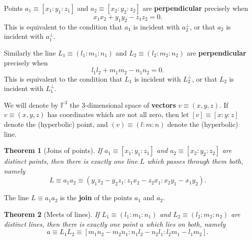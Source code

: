 \documentclass{unswthesis}
\newtheorem{theorem}{Theorem}
\begin{document}
Points $a_{1}\equiv[x_{1}:y_{1}:z_{1}]$ and $a_{2}\equiv[x_{2}:y_{2}:z_{2}]$
are \textbf{perpendicular} precisely when 
\begin{equation*}
x_{1}x_{2}+y_{1}y_{2}-z_{1}z_{2}=0. 
\end{equation*}
This is equivalent to the condition that $a_{1}$ is incident with $%
a_{2}^{\perp}$, or that $a_{2}$ is incident with $a_{1}^{\perp}$.\newline

Similarly the line $L_{1}\equiv(l_{1}:m_{1}:n_{1})$ and $L_{2}%
\equiv(l_{2}:m_{2}:n_{2})$ are \textbf{perpendicular} precisely when 
\begin{equation*}
l_{1}l_{2}+m_{1}m_{2}-n_{1}n_{2}=0. 
\end{equation*}
This is equivalent to the condition that $L_{1}$ is incident with $%
L_{2}^{\perp}$, or that $L_{2}$ is incident with $L_{1}^{\perp}$.\newline

We will denote by $\mathbb{F}^{3}$ the 3-dimensional space of \textbf{vectors%
} $v\equiv(x,y,z)$. If $v\equiv(x,y,z)$ has coordinates which are not all
zero, then let $[v]\equiv[x:y:z]$ denote the (hyperbolic) point, and $%
(v)\equiv(l:m:n)$ denote the (hyperbolic) line.\newline

\begin{theorem}[Joins of points]
If $a_{1}\equiv[x_{1}:y_{1}:z_{1}]$ and $a_{2}\equiv[x_{2}:y_{2}:z_{2}]$ are
distinct points, then there is exactly one line $L$ which passes through
them both, namely 
\begin{equation*}
L\equiv
a_{1}a_{2}%
\equiv(y_{1}z_{2}-y_{2}z_{1}:z_{1}x_{2}-z_{2}x_{1}:x_{2}y_{1}-x_{1}y_{2}). 
\end{equation*}
\end{theorem}

The line $L\equiv a_{1}a_{2}$ is the \textbf{join} of the points $a_{1}$ and 
$a_{2}$.\newline

\begin{theorem}[Meets of lines]
If $L_{1}\equiv(l_{1}:m_{1}:n_{1})$ and $L_{2}\equiv(l_{2}:m_{2}:n_{2})$ are
distinct lines, then there is exactly one point $a$ which lies on both,
namely 
\begin{equation*}
a\equiv L_{1}L_{2}\equiv[%
m_{1}n_{2}-m_{2}n_{1}:n_{1}l_{2}-n_{2}l_{1}:l_{2}m_{1}-l_{1}m_{2}]. 
\end{equation*}
\end{theorem}
\end{document}
